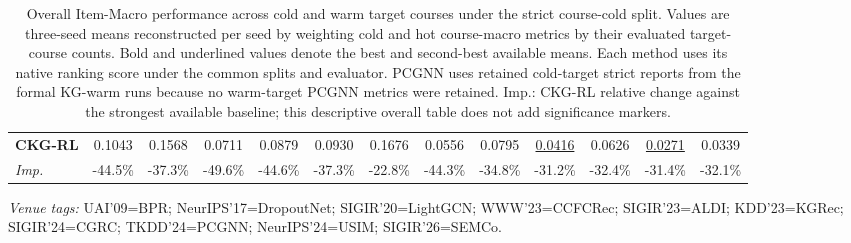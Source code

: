 \documentclass[10pt]{article}
\begin{document}
\begin{table}[!ht]
{\begin{tabular}{lcccccccccccc}
\midrule
\textbf{CKG-RL} & 0.1043 & 0.1568 & 0.0711 & 0.0879 & 0.0930 & 0.1676 & 0.0556 & 0.0795 & \underline{0.0416} & 0.0626 & \underline{0.0271} & 0.0339 \\
\emph{Imp.} & -44.5\% & -37.3\% & -49.6\% & -44.6\% & -37.3\% & -22.8\% & -44.3\% & -34.8\% & -31.2\% & -32.4\% & -31.4\% & -32.1\% \\
\bottomrule
\end{tabular}
}
\caption{Overall Item-Macro performance across cold and warm target courses under the strict course-cold split. Values are three-seed means reconstructed per seed by weighting cold and hot course-macro metrics by their evaluated target-course counts. Bold and underlined values denote the best and second-best available means. Each method uses its native ranking score under the common splits and evaluator. PCGNN uses retained cold-target strict reports from the formal KG-warm runs because no warm-target PCGNN metrics were retained. Imp.: CKG-RL relative change against the strongest available baseline; this descriptive overall table does not add significance markers.}
\label{tab:overall-item-macro-main}
\vspace{0.2em}
\begin{minipage}{\textwidth}
\scriptsize\emph{Venue tags:} UAI'09=BPR; NeurIPS'17=DropoutNet; SIGIR'20=LightGCN; WWW'23=CCFCRec; SIGIR'23=ALDI; KDD'23=KGRec; SIGIR'24=CGRC; TKDD'24=PCGNN; NeurIPS'24=USIM; SIGIR'26=SEMCo.
\end{minipage}
\end{table}
\end{document}
